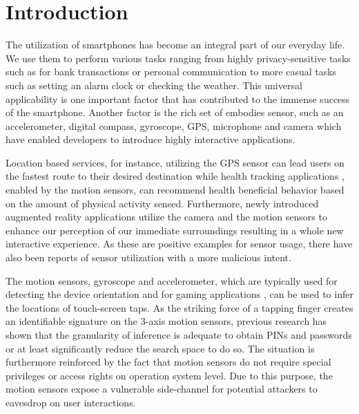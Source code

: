 \chapter{Introduction\label{cha:chapter1}}
The utilization of smartphones has become an integral part of our everyday life. We use them to perform various tasks ranging from highly privacy-sensitive tasks such as for bank transactions or personal communication to more casual tasks such as setting an alarm clock or checking the weather. This universal applicability is one important factor that has contributed to the immense success of the smartphone. Another factor is the rich set of embodies sensor, such as an accelerometer, digital compass, gyroscope, GPS, microphone and camera \cite{5560598} which have enabled developers to introduce highly interactive applications.



Location based services, for instance, utilizing the GPS sensor \cite{link2011footpath} can lead users on the fastest route to their desired destination while health tracking applications \cite{case2015accuracy}, enabled by the motion sensors, can recommend health beneficial behavior based on the amount of physical activity sensed. Furthermore, newly introduced augmented reality applications utilize the camera and the motion sensors to enhance our perception of our immediate surroundings resulting in a whole new interactive experience. As these are positive examples for sensor usage, there have also been reports of sensor utilization with a more malicious intent.

The motion sensors, gyroscope and accelerometer, which are typically used for detecting the device orientation and for gaming applications \cite{feijoo2012mobile}, can be used to infer the locations of touch-screen taps. As the striking force of a tapping finger creates an identifiable signature on the 3-axis motion sensors, previous research has shown that the granularity of inference is adequate to obtain PINs and passwords \cite{Touchlogger, Tapprints, Accessory} or at least significantly reduce the search space to do so. The situation is furthermore reinforced by the fact that motion sensors do not require special privileges or access rights on operation system level. Due to this purpose, the motion sensors expose a vulnerable side-channel for potential attackers to eavesdrop on user interactions.

